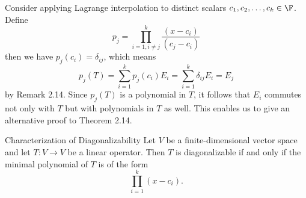 \documentclass[linearalgebraII]{subfiles}
\begin{document}
    \begin{remark}
        Consider applying Lagrange interpolation to distinct scalars $c_1, c_2, \ldots, c_k\in \F$. Define
        \begin{equation*}
            p_j = \prod^{k}_{i=1,i\neq j} \frac{(x-c_i)}{(c_j-c_i)}
        \end{equation*}
        then we have $p_j(c_i) = \delta_{ij}$, which means
        \begin{equation*}
            p_j(T) = \sum^{k}_{i=1} p_j(c_i)E_i = \sum^{k}_{i=1} \delta_{ij}E_i = E_j
        \end{equation*}
        by Remark 2.14. Since $p_j(T)$ is a polynomial in $T$, it follows that $E_i$ commutes not only with $T$ but with polynomials in $T$ as well. This enables us to give an alternative proof to Theorem 2.14.
    \end{remark}

    \setcounter{stcounter}{13}
    \begin{theorem}{Characterization of Diagonalizability}
        Let $V$ be a finite-dimensional vector space and let $T:V\to V$ be a linear operator. Then $T$ is diagonalizable if and only if the minimal polynomial of $T$ is of the form
        \begin{equation*}
            \prod^{k}_{i=1} (x-c_i).
        \end{equation*}
    \end{theorem}
    \setcounter{stcounter}{19}
\end{document}
